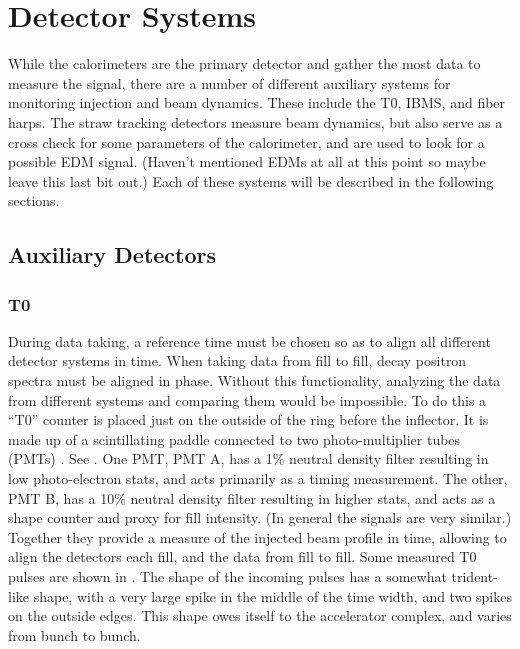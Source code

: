 
\thispagestyle{myheadings}

\graphicspath{{Body/Figures/ExperimentalOverview/Ring/}{Body/Figures/TrackingFigures/TrackerPics/}{Body/Figures/ExperimentalOverview/Auxiliary/}}

\chapter{Detector Systems}
\label{sec:DetectorSystems}

While the calorimeters are the primary detector and gather the most data to measure the \wa signal, there are a number of different auxiliary systems for monitoring injection and beam dynamics. These include the T0, IBMS, and fiber harps. The straw tracking detectors measure beam dynamics, but also serve as a cross check for some parameters of the calorimeter, and are used to look for a possible EDM signal. (Haven't mentioned EDMs at all at this point so maybe leave this last bit out.) Each of these systems will be described in the following sections.


\section{Auxiliary Detectors}

\subsection{T0}
\label{sec:T0}

During data taking, a reference time must be chosen so as to align all different detector systems in time. When taking data from fill to fill, decay positron spectra must be aligned in phase. Without this functionality, analyzing the data from different systems and comparing them would be impossible. To do this a ``T0'' counter is placed just on the outside of the ring before the inflector. It is made up of a scintillating paddle connected to two photo-multiplier tubes (PMTs) \cite{t0Hannah,t0Aaron}. See . One PMT, PMT A, has a 1\% neutral density filter resulting in low photo-electron stats, and acts primarily as a timing measurement. The other, PMT B, has a 10\% neutral density filter resulting in higher stats, and acts as a shape counter and proxy for fill intensity. (In general the signals are very similar.) Together they provide a measure of the injected beam profile in time, allowing to align the detectors each fill, and the data from fill to fill. Some measured T0 pulses are shown in . The shape of the incoming pulses has a somewhat trident-like shape, with a very large spike in the middle of the time width, and two spikes on the outside edges. This shape owes itself to the accelerator complex, and varies from bunch to bunch.


